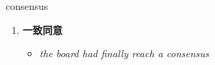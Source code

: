 
\begin{frame}
{\huge consensus}
\begin{center}
\begin{enumerate}\Large
  \item \textbf{一致同意}
  \begin{itemize}
    \item \em{\Large{the board had finally reach a consensus}}
  \end{itemize}
\end{enumerate}
\end{center}
\end{frame}
